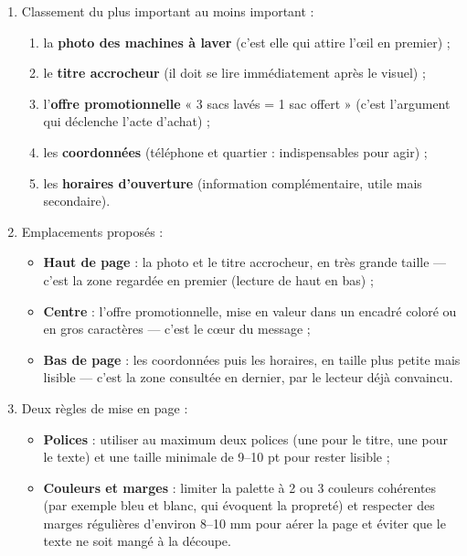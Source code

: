 \documentclass[11pt]{article}
\begin{document}
\begin{corrige}
\begin{enumerate}
\item Classement du plus important au moins important :
\begin{enumerate}
\item la \textbf{photo des machines à laver} (c'est elle qui attire l'œil en premier) ;
\item le \textbf{titre accrocheur} (il doit se lire immédiatement après le visuel) ;
\item l'\textbf{offre promotionnelle} « 3 sacs lavés = 1 sac offert » (c'est l'argument qui déclenche l'acte d'achat) ;
\item les \textbf{coordonnées} (téléphone et quartier : indispensables pour agir) ;
\item les \textbf{horaires d'ouverture} (information complémentaire, utile mais secondaire).
\end{enumerate}
\item Emplacements proposés :
\begin{itemize}
\item \textbf{Haut de page} : la photo et le titre accrocheur, en très grande taille — c'est la zone regardée en premier (lecture de haut en bas) ;
\item \textbf{Centre} : l'offre promotionnelle, mise en valeur dans un encadré coloré ou en gros caractères — c'est le cœur du message ;
\item \textbf{Bas de page} : les coordonnées puis les horaires, en taille plus petite mais lisible — c'est la zone consultée en dernier, par le lecteur déjà convaincu.
\end{itemize}
\item Deux règles de mise en page :
\begin{itemize}
\item \textbf{Polices} : utiliser au maximum deux polices (une pour le titre, une pour le texte) et une taille minimale de 9--10 pt pour rester lisible ;
\item \textbf{Couleurs et marges} : limiter la palette à 2 ou 3 couleurs cohérentes (par exemple bleu et blanc, qui évoquent la propreté) et respecter des marges régulières d'environ 8--10 mm pour aérer la page et éviter que le texte ne soit mangé à la découpe.
\end{itemize}
\end{enumerate}
\end{corrige}
\end{document}

